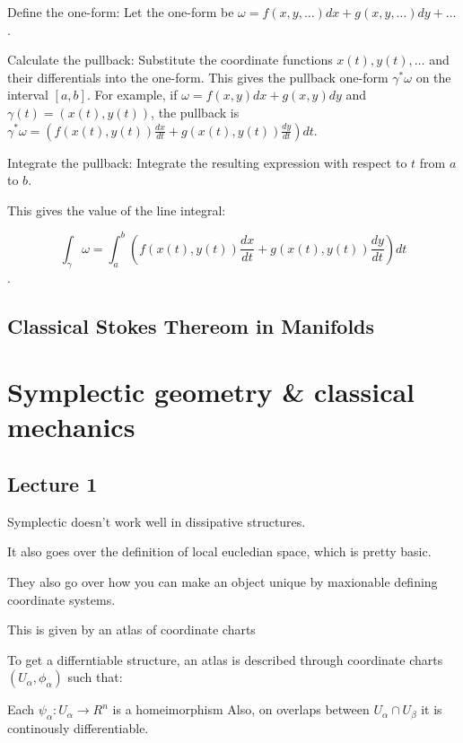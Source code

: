 Define the one-form: Let the one-form be \(\omega =f(x,y,\dots )dx+g(x,y,\dots )dy+\dots \). 

Calculate the pullback: Substitute the coordinate functions \(x(t),y(t),\dots \) and their differentials into the one-form. This gives the pullback one-form \(\gamma ^{*}\omega \) on the interval \([a,b]\). For example, if \(\omega =f(x,y)dx+g(x,y)dy\) and \(\gamma (t)=(x(t),y(t))\), the pullback is \(\gamma ^{*}\omega =(f(x(t),y(t))\frac{dx}{dt}+g(x(t),y(t))\frac{dy}{dt})dt\).

Integrate the pullback: Integrate the resulting expression with respect to \(t\) from \(a\) to \(b\). 

This gives the value of the line integral: 

\[\int _{\gamma }\omega =\int _{a}^{b}(f(x(t),y(t))\frac{dx}{dt}+g(x(t),y(t))\frac{dy}{dt})dt\].

\subsection{Classical Stokes Thereom in Manifolds}

\section{Symplectic geometry & classical mechanics}
\subsection{Lecture 1}
Symplectic doesn't work well in dissipative structures.

It also goes over the definition of local eucledian space, which is pretty basic.

They also go over how you can make an object unique by maxionable defining coordinate systems. 

This is given by an atlas of coordinate charts 

To get a differntiable structure, an atlas is described through coordinate charts $(U_\alpha, \phi_\alpha)$ such that:

Each $\psi_\alpha: U_\alpha \to R^n$ is a homeimorphism
Also, on overlaps between $U_\alpha \cap U_\beta$ it is continously differentiable.
